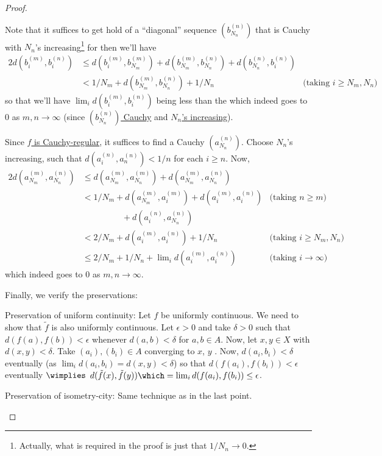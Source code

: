 \begin{proof}
\begin{prooflist}
			Note that it suffices to get hold of a ``diagonal'' sequence $(b^{(n)}_{N_n})$ that is Cauchy with $N_n$'s increasing\footnote{
				Actually, what is required in the proof is just that $1/N_n\to 0$.
			} for then we'll have
			\begin{alignat*}{2}
				d(b^{(m)}_i, b^{(n)}_i)
				& \le d(b^{(m)}_i, b^{(m)}_{N_m}) + d(b^{(m)}_{N_m}, b^{(n)}_{N_n}) + d(b^{(n)}_{N_n}, b^{(n)}_i)\\
				& < 1/N_m + d(b^{(m)}_{N_m}, b^{(n)}_{N_n}) + 1/N_n & \text{(taking $i\ge N_m, N_n$)}
			\end{alignat*}
			so that we'll have $\lim_i d(b^{(m)}_i, b^{(n)}_i)$ being less than the \RHS which indeed goes to $0$ as $m, n\to \infty$ (since \ul{$(b^{(n)}_{N_n})$ Cauchy} and \ul{$N_n$'s increasing}).
			
			Since \ul{$f$ is Cauchy-regular}, it suffices to find a Cauchy $(a^{(n)}_{N_n})$. Choose $N_n$'s increasing, such that $d(a^{(n)}_i, a^{(n)}_n) < 1/n$ for each $i\ge n$. Now,
			\begin{alignat*}{2}
				d(a^{(m)}_{N_m}, a^{(n)}_{N_n})
				& \le d(a^{(m)}_{N_m}, a^{(m)}_{N_n}) + d(a^{(m)}_{N_m}, a^{(n)}_{N_n})\\
				& < 1/N_m + d(a^{(m)}_{N_m}, a^{(m)}_i) + d(a^{(m)}_i, a^{(n)}_i) & \text{(taking $n\ge m$)}\\
				& \phantom{{} < 1/N_m}\hspace{10pt} {} + d(a^{(n)}_i, a^{(n)}_{N_n})\\
				& < 2/N_m + d(a^{(m)}_i, a^{(n)}_i) + 1/N_n & \text{(taking $i\ge N_m, N_n$)}\\
				& \le 2/N_m + 1/N_n + \lim\nolimits_i d(a^{(m)}_i, a^{(n)}_i) & \text{(taking $i\to \infty$)}
			\end{alignat*}
			which indeed goes to $0$ as $m, n\to\infty$.
		\end{prooflist}
			
		Finally, we verify the preservations:
			\begin{prooflist}
				\item Preservation of uniform continuity:
				Let $f$ be uniformly continuous. We need to show that $\tilde f$ is also uniformly continuous. Let $\epsilon > 0$ and take $\delta > 0$ such that $d(f(a), f(b)) < \epsilon$ whenever $d(a, b) < \delta$ for $a, b\in A$. Now, let $x, y\in X$ with $d(x, y) < \delta$. Take $(a_i), (b_i)\in A$ converging to $x$, $y$ \resp. Now, $d(a_i, b_i) < \delta$ eventually (as $\lim_i d(a_i, b_i) = d(x, y) < \delta$) so that $d(f(a_i), f(b_i)) < \epsilon$ eventually $\wimplies$ $d(\tilde f(x), \tilde f(y)) \which= \lim_i d(f(a_i), f(b_i))\le \epsilon$.
				
				
				\item Preservation of isometry-city:
				Same technique as in the last point.
				\qedhere
			\end{prooflist}
	\end{proof}
	
